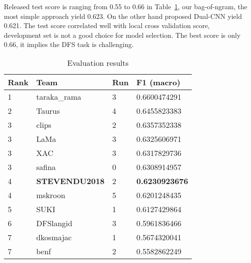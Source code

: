\documentclass[11pt]{article}
\begin{document}
Released test score is ranging from 0.55 to 0.66 in Table~\ref{my-label}, our bag-of-ngram, the most simple approach yield 0.623. On the other hand proposed Dual-CNN yield 0.621. The test score correlated well with local cross validation score, development set is not a good choice for model selection. The best score is only 0.66, it implies the DFS task is challenging. 

\begin{table}[h]
	\centering

	\begin{tabular}{|l|l|l|l|}
		 \hline
		Rank & Team         & Run & F1 (macro)     \\  \hline
		1    & taraka\_rama & 3   & 0.6600474291   \\  \hline
		2                          & Taurus                            & 4                        & 0.6455823383   \\  \hline
		3                          & clips                             & 2                        & 0.6357352338   \\  \hline
		3                          & LaMa                              & 3                        & 0.6325606971   \\ \hline
		3                          & XAC                               & 3                        & 0.6317829736   \\ \hline
		3                          & safina                            & 0                        & 0.6308914957   \\ \hline
		4                          & \textbf{STEVENDU2018}                      & 2                        & \textbf{0.6230923676}   \\ \hline
		4                          & mskroon                           & 5                        & 0.6201248435   \\ \hline
		5                          & SUKI                              & 1                        & 0.6127429864   \\ \hline
		6                          & DFSlangid                         & 3                        & 0.5961836466   \\ \hline
		7                          & dkosmajac                         & 1                        & 0.5674320041   \\ \hline
		7                          & benf                              & 2                        & 0.5582862249   \\  \hline
	\end{tabular}	
	\caption{Evaluation results}
	\label{my-label}
\end{table}
\end{document}
